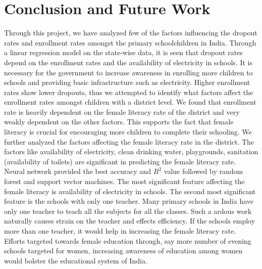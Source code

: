 \documentclass{article}
\begin{document}
\section{Conclusion and Future Work}
Through this project, we have analyzed few of the factors influencing the dropout rates and enrollment rates amongst the primary schoolchildren in India. Through a linear regression model on the state-wise data, it is seen that dropout rates depend on the enrollment rates and the availability of electricity in schools. It is necessary for the government to increase awareness in enrolling more children to schools and providing basic infrastructure such as electricity. Higher enrollment rates show lower dropouts, thus we attempted to identify what factors affect the enrollment rates amongst children with a district level. We found that enrollment rate is heavily dependent on the female literacy rate of the district and very weakly dependent on the other factors. This supports the fact that female literacy is crucial for encouraging more children to complete their schooling. We further analyzed the factors affecting the female literacy rate in the district. The factors like availability of electricity, clean drinking water, playgrounds, sanitation (availability of toilets) are significant in predicting the female literacy rate. Neural network provided the best accuracy and $R^2$ value followed by random forest and support vector machines. The most significant feature affecting the female literacy is availability of electricity in schools. The second most significant feature is the schools with only one teacher. Many primary schools in India have only one teacher to teach all the subjects for all the classes. Such a ardous work naturally causes strain on the teacher and effects efficiency. If the schools employ more than one teacher, it would help in increasing the female literacy rate. Efforts targeted towards female education through, say more number of evening schools targeted for women, increasing awareness of education among women would bolster the educational system of India.
\end{document}

